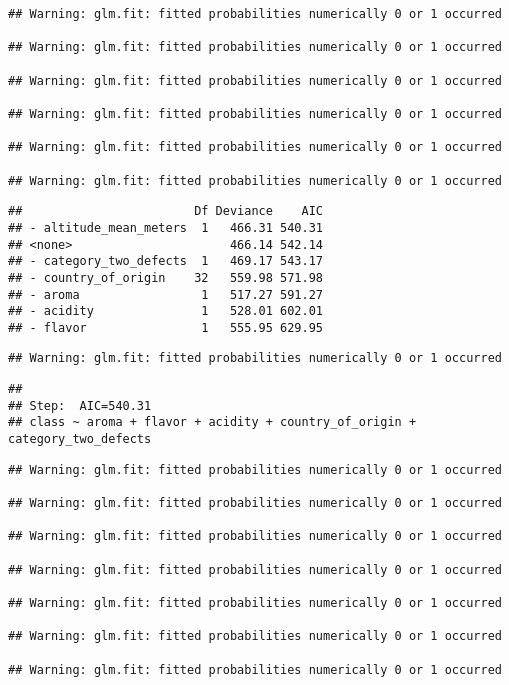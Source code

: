 \documentclass[
]{article}
\begin{document}
\begin{verbatim}
## Warning: glm.fit: fitted probabilities numerically 0 or 1 occurred

## Warning: glm.fit: fitted probabilities numerically 0 or 1 occurred

## Warning: glm.fit: fitted probabilities numerically 0 or 1 occurred

## Warning: glm.fit: fitted probabilities numerically 0 or 1 occurred

## Warning: glm.fit: fitted probabilities numerically 0 or 1 occurred

## Warning: glm.fit: fitted probabilities numerically 0 or 1 occurred
\end{verbatim}

\begin{verbatim}
##                        Df Deviance    AIC
## - altitude_mean_meters  1   466.31 540.31
## <none>                      466.14 542.14
## - category_two_defects  1   469.17 543.17
## - country_of_origin    32   559.98 571.98
## - aroma                 1   517.27 591.27
## - acidity               1   528.01 602.01
## - flavor                1   555.95 629.95
\end{verbatim}

\begin{verbatim}
## Warning: glm.fit: fitted probabilities numerically 0 or 1 occurred
\end{verbatim}

\begin{verbatim}
## 
## Step:  AIC=540.31
## class ~ aroma + flavor + acidity + country_of_origin + category_two_defects
\end{verbatim}

\begin{verbatim}
## Warning: glm.fit: fitted probabilities numerically 0 or 1 occurred

## Warning: glm.fit: fitted probabilities numerically 0 or 1 occurred

## Warning: glm.fit: fitted probabilities numerically 0 or 1 occurred

## Warning: glm.fit: fitted probabilities numerically 0 or 1 occurred

## Warning: glm.fit: fitted probabilities numerically 0 or 1 occurred

## Warning: glm.fit: fitted probabilities numerically 0 or 1 occurred

## Warning: glm.fit: fitted probabilities numerically 0 or 1 occurred
\end{verbatim}
\end{document}
